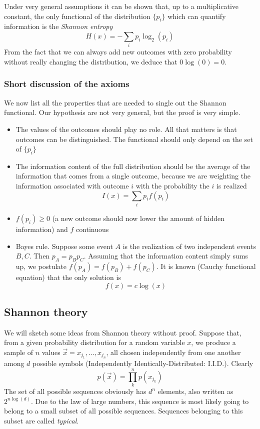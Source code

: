 \documentclass[a4paper, 11pt]{article}
\begin{document}
	Under very general assumptions it can be shown that, up to a multiplicative constant, the only functional of the distribution $\{p_i\}$ which can quantify information is the \emph{Shannon entropy}
	\[ H(x) = -\sum_i p_i \log_2(p_i) \]
	From the fact that we can always add new outcomes with zero probability without really changing the distribution, we deduce that $0 \log(0) = 0$. 
	
	\subsubsection{Short discussion of the axioms}
	We now list all the properties that are needed to single out the Shannon functional. Our hypothesis are not very general, but the proof is very simple.
	\begin{itemize}
		\item The values of the outcomes should play no role. All that matters is that outcomes can be distinguished. The functional should only depend on the set of $\{p_i\}$
		\item The information content of the full distribution should be the average of the information that comes from a single outcome, because we are weighting the information associated with outcome $i$ with the probability the $i$ is realized
		\[ I(x) = \sum_i p_i f(p_i) \]
		\item $f(p_i)\ge 0$ (a new outcome should now lower the amount of hidden information) and $f$ continuous
		\item Bayes rule. Suppose some event $A$ is the realization of two independent events $B,C$. Then $p_A=p_Bp_C$. Assuming that the information content simply sums up, we postulate $f(p_A) = f(p_B) + f(p_C)$. It is known (Cauchy functional equation) that the only solution is
		\[ f(x) = c \log(x) \]
	\end{itemize}
	
	\subsection{Shannon theory}
	We will sketch some ideas from Shannon theory without proof.
	Suppose that, from a given probability distribution for a random variable $x$, we produce a sample of $n$ values $\vec{x} = x_{j_1},\dots,x_{j_n}$, all chosen independently from one another among $d$ possible symbols (Independently Identically-Distributed: I.I.D.). Clearly
	\[ p(\vec{x}) = \prod_k^n p(x_{j_k}) \]
	The set of all possible sequences obviously has $d^n$ elements, also written as $2^{n\log(d)}$.
	Due to the law of large numbers, this sequence is most likely going to belong to a small subset of all possible sequences. Sequences belonging to this subset are called \emph{typical}.
	
\end{document}
